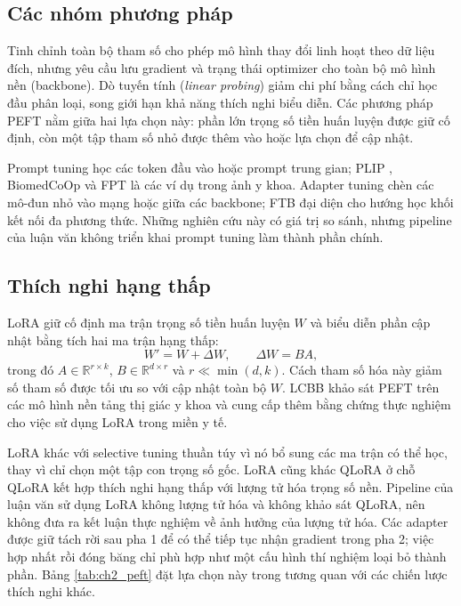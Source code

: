 \subsection{Các nhóm phương pháp}

Tinh chỉnh toàn bộ tham số cho phép mô hình thay đổi linh hoạt theo dữ liệu đích, nhưng yêu cầu lưu gradient và trạng thái optimizer cho toàn bộ mô hình nền (backbone). Dò tuyến tính (\textit{linear probing}) giảm chi phí bằng cách chỉ học đầu phân loại, song giới hạn khả năng thích nghi biểu diễn. Các phương pháp PEFT nằm giữa hai lựa chọn này: phần lớn trọng số tiền huấn luyện được giữ cố định, còn một tập tham số nhỏ được thêm vào hoặc lựa chọn để cập nhật.

Prompt tuning học các token đầu vào hoặc prompt trung gian; PLIP \cite{PLIP}, BiomedCoOp \cite{BiomedCoOp} và FPT \cite{FPT} là các ví dụ trong ảnh y khoa. Adapter tuning chèn các mô-đun nhỏ vào mạng hoặc giữa các backbone; FTB \cite{FTB} đại diện cho hướng học khối kết nối đa phương thức. Những nghiên cứu này có giá trị so sánh, nhưng pipeline của luận văn không triển khai prompt tuning làm thành phần chính.

\subsection{Thích nghi hạng thấp}

LoRA \cite{Hu2022LoRA} giữ cố định ma trận trọng số tiền huấn luyện $W$ và biểu diễn phần cập nhật bằng tích hai ma trận hạng thấp:
\begin{equation}
    W' = W + \Delta W, \qquad \Delta W = BA,
\end{equation}
trong đó $A \in \mathbb{R}^{r\times k}$, $B \in \mathbb{R}^{d\times r}$ và $r \ll \min(d,k)$. Cách tham số hóa này giảm số tham số được tối ưu so với cập nhật toàn bộ $W$. LCBB \cite{LCBB} khảo sát PEFT trên các mô hình nền tảng thị giác y khoa và cung cấp thêm bằng chứng thực nghiệm cho việc sử dụng LoRA trong miền y tế.

LoRA khác với selective tuning thuần túy vì nó bổ sung các ma trận có thể học, thay vì chỉ chọn một tập con trọng số gốc. LoRA cũng khác QLoRA ở chỗ QLoRA kết hợp thích nghi hạng thấp với lượng tử hóa trọng số nền. Pipeline của luận văn sử dụng LoRA không lượng tử hóa và không khảo sát QLoRA, nên không đưa ra kết luận thực nghiệm về ảnh hưởng của lượng tử hóa. Các adapter được giữ tách rời sau pha 1 để có thể tiếp tục nhận gradient trong pha 2; việc hợp nhất rồi đóng băng chỉ phù hợp như một cấu hình thí nghiệm loại bỏ thành phần. Bảng \ref{tab:ch2_peft} đặt lựa chọn này trong tương quan với các chiến lược thích nghi khác.

